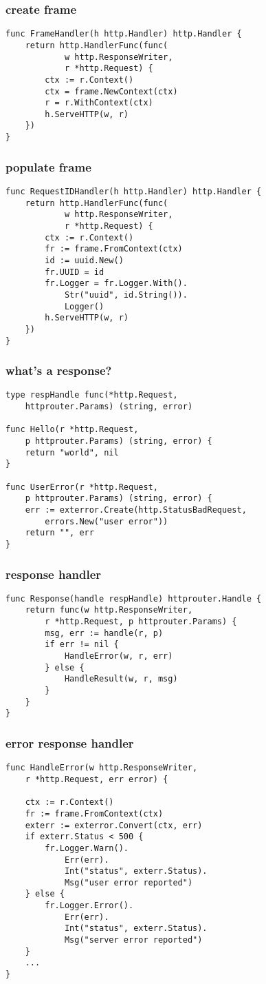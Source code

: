\documentclass{beamer}
\begin{document}
\begin{frame}[fragile]
\frametitle{create frame}
\begin{lstlisting}[basicstyle=\ttfamily\footnotesize]
func FrameHandler(h http.Handler) http.Handler {
	return http.HandlerFunc(func(
			w http.ResponseWriter,
			r *http.Request) {
		ctx := r.Context()
		ctx = frame.NewContext(ctx)
		r = r.WithContext(ctx)
		h.ServeHTTP(w, r)
	})
}
\end{lstlisting}
\end{frame}

\begin{frame}[fragile]
\frametitle{populate frame}
\begin{lstlisting}[basicstyle=\ttfamily\footnotesize]
func RequestIDHandler(h http.Handler) http.Handler {
	return http.HandlerFunc(func(
			w http.ResponseWriter,
			r *http.Request) {
		ctx := r.Context()
		fr := frame.FromContext(ctx)
		id := uuid.New()
		fr.UUID = id
		fr.Logger = fr.Logger.With().
			Str("uuid", id.String()).
			Logger()
		h.ServeHTTP(w, r)
	})
}
\end{lstlisting}
\end{frame}

\begin{frame}[fragile]
\frametitle{what's a response?}
\begin{lstlisting}[basicstyle=\ttfamily\footnotesize]
type respHandle func(*http.Request,
	httprouter.Params) (string, error)

func Hello(r *http.Request,
	p httprouter.Params) (string, error) {
	return "world", nil
}

func UserError(r *http.Request,
	p httprouter.Params) (string, error) {
	err := exterror.Create(http.StatusBadRequest,
		errors.New("user error"))
	return "", err
}
\end{lstlisting}
\end{frame}

\begin{frame}[fragile]
\frametitle{response handler}
\begin{lstlisting}[basicstyle=\ttfamily\footnotesize]
func Response(handle respHandle) httprouter.Handle {
	return func(w http.ResponseWriter,
		r *http.Request, p httprouter.Params) {
		msg, err := handle(r, p)
		if err != nil {
			HandleError(w, r, err)
		} else {
			HandleResult(w, r, msg)
		}
	}
}
\end{lstlisting}
\end{frame}

\begin{frame}[fragile]
\frametitle{error response handler}
\begin{lstlisting}[basicstyle=\ttfamily\footnotesize]
func HandleError(w http.ResponseWriter,
	r *http.Request, err error) {

	ctx := r.Context()
	fr := frame.FromContext(ctx)
	exterr := exterror.Convert(ctx, err)
	if exterr.Status < 500 {
		fr.Logger.Warn().
			Err(err).
			Int("status", exterr.Status).
			Msg("user error reported")
	} else {
		fr.Logger.Error().
			Err(err).
			Int("status", exterr.Status).
			Msg("server error reported")
	}
	...
}
\end{lstlisting}
\end{frame}
\end{document}
